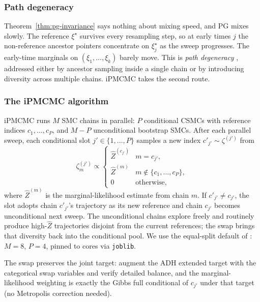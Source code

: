 \subsubsection{Path degeneracy}

Theorem~\ref{thm:pg-invariance} says nothing about mixing speed, and PG mixes slowly. The reference $\xi^\star$ survives every resampling step, so at early times $j$ the non-reference ancestor pointers concentrate on $\xi^\star_j$ as the sweep progresses. The early-time marginals on $(\xi_1, \dots, \xi_k)$ barely move. This is \emph{path degeneracy} \citep{lindsten2014particle, rainforth2016interacting}, addressed either by ancestor sampling inside a single chain \citep{lindsten2014particle} or by introducing diversity across multiple chains. iPMCMC takes the second route.

\subsubsection{The iPMCMC algorithm}

iPMCMC \citep{rainforth2016interacting} runs $M$ SMC chains in parallel: $P$ conditional CSMCs with reference indices $c_1, \dots, c_P$, and $M - P$ unconditional bootstrap SMCs. After each parallel sweep, each conditional slot $j' \in \{1, \dots, P\}$ samples a new index $c'_{j'} \sim \zeta^{(j')}$ from
\begin{equation}\label{eq:swap}
\zeta^{(j')}_m \propto \begin{cases} \widehat Z^{(c_{j'})} & m = c_{j'}, \\ \widehat Z^{(m)} & m \notin \{c_1, \dots, c_P\}, \\ 0 & \text{otherwise}, \end{cases}
\end{equation}
where $\widehat Z^{(m)}$ is the marginal-likelihood estimate from chain $m$. If $c'_{j'} \neq c_{j'}$, the slot adopts chain $c'_{j'}$'s trajectory as its new reference and chain $c_{j'}$ becomes unconditional next sweep. The unconditional chains explore freely and routinely produce high-$\widehat Z$ trajectories disjoint from the current references; the swap brings that diversity back into the conditional pool. We use the equal-split default of \citet{rainforth2016interacting}: $M = 8$, $P = 4$, pinned to cores via \texttt{joblib}.

The swap preserves the joint target: \citet[Theorem~1]{rainforth2016interacting} augment the ADH extended target with the categorical swap variables and verify detailed balance, and the marginal-likelihood weighting is exactly the Gibbs full conditional of $c_{j'}$ under that target (no Metropolis correction needed).

